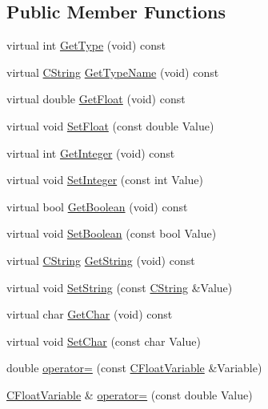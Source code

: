 \subsection*{Public Member Functions}
\begin{DoxyCompactItemize}
\item 
virtual int \hyperlink{classCFloatVariable_acd359d977869758d423ad207c108eaa7}{Get\-Type} (void) const 
\item 
virtual \hyperlink{classCString}{C\-String} \hyperlink{classCFloatVariable_a0b28d738f0395143ae5ebca6b5ed19a2}{Get\-Type\-Name} (void) const 
\item 
virtual double \hyperlink{classCFloatVariable_ae591dcf958100c9702162ae4335f7589}{Get\-Float} (void) const 
\item 
virtual void \hyperlink{classCFloatVariable_ae7e6889263d0d1e6199fc814109e2049}{Set\-Float} (const double Value)
\item 
virtual int \hyperlink{classCFloatVariable_a7a6d456bfb26f4e008e8dfc9db480a03}{Get\-Integer} (void) const 
\item 
virtual void \hyperlink{classCFloatVariable_ad6b19217796d4817cfde059b03e57a9b}{Set\-Integer} (const int Value)
\item 
virtual bool \hyperlink{classCFloatVariable_af662cca772ad13969a23f4dc78af38ea}{Get\-Boolean} (void) const 
\item 
virtual void \hyperlink{classCFloatVariable_a767ea025e89f033e1ba6e98b5c967691}{Set\-Boolean} (const bool Value)
\item 
virtual \hyperlink{classCString}{C\-String} \hyperlink{classCFloatVariable_a7aa60c5828e23145adec0cd6116e5d41}{Get\-String} (void) const 
\item 
virtual void \hyperlink{classCFloatVariable_a413448c60d1be13e1b28ea4e56733abc}{Set\-String} (const \hyperlink{classCString}{C\-String} \&Value)
\item 
virtual char \hyperlink{classCFloatVariable_ab9cc3930a0c138a2e198c6d0e8f3626c}{Get\-Char} (void) const 
\item 
virtual void \hyperlink{classCFloatVariable_acc613e2a2897e2e45c9b666c8ea8ae2a}{Set\-Char} (const char Value)
\item 
double \hyperlink{classCFloatVariable_a7b4b14c140e201a1c0b42631c29235d4}{operator=} (const \hyperlink{classCFloatVariable}{C\-Float\-Variable} \&Variable)
\item 
\hyperlink{classCFloatVariable}{C\-Float\-Variable} \& \hyperlink{classCFloatVariable_a4ef005421df21170149a87b70c6a61b6}{operator=} (const double Value)

\end{DoxyCompactItemize}
